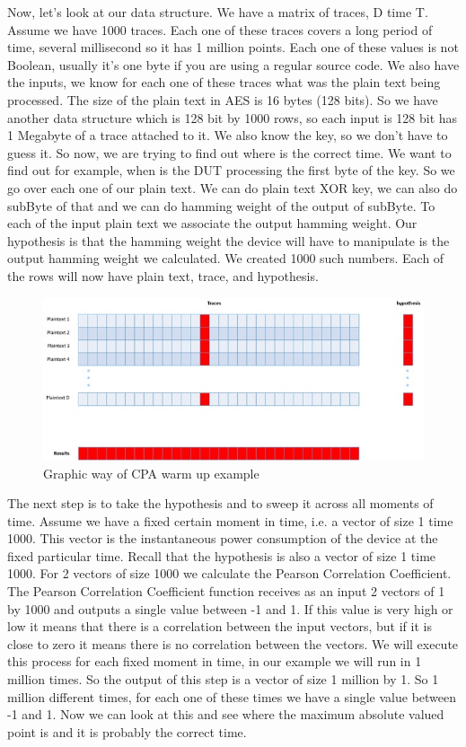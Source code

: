Now, let's look at our data structure. We have a matrix of traces, D time T. Assume we have 1000 traces. Each one of these traces covers a long period of time, several millisecond so it has 1 million points. Each one of these values is not Boolean, usually it's one byte if you are using a regular source code. We also have the inputs, we know for each one of these traces what was the plain text being processed. The size of the plain text in AES is 16 bytes (128 bits). So we have another data structure which is 128 bit by 1000 rows, so each input is 128 bit has 1 Megabyte of a trace attached to it. We also know the key, so we don't have to guess it. So now, we are trying to find out where is the correct time. We want to find out for example, when is the DUT processing the first byte of the key. So we go over each one of our plain text. We can do plain text XOR key, we can also do subByte of that and we can do hamming weight of the output of subByte. To each of the input plain text we associate the output hamming weight. Our hypothesis is that the hamming weight the device will have to manipulate is the output hamming weight we calculated. We created 1000 such numbers. Each of the rows will now have plain text, trace, and hypothesis.

\begin{figure}[!ht]
    \centering
    \includegraphics[width=1.0\textwidth]{images/chapter8/cpa_warmup_example.jpg}
    \caption{Graphic way of CPA warm up example} \label{c8_cpa_warmup_example:fig}
\end{figure}

The next step is to take the hypothesis and to sweep it across all moments of time. Assume we have a fixed certain moment in time, i.e. a vector of size 1 time 1000. This vector is the instantaneous power consumption of the device at the fixed particular time. Recall that the hypothesis is also a vector of size 1 time 1000. For 2 vectors of size 1000 we calculate the Pearson Correlation Coefficient. The Pearson Correlation Coefficient function receives as an input 2 vectors of 1 by 1000 and outputs a single value between -1 and 1. If this value is very high or low it means that there is a correlation between the input vectors, but if it is close to zero it means there is no correlation between the vectors. We will execute this process for each fixed moment in time, in our example we will run in 1 million times. So the output of this step is a vector of size 1 million by 1. So 1 million different times, for each one of these times we have a single value between -1 and 1. Now we can look at this and see where the maximum absolute valued point is and it is probably the correct time.

